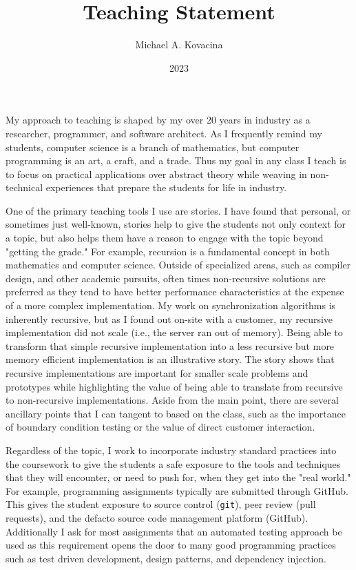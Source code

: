 \documentclass[12pt]{article}
\title{Teaching Statement}
\author{Michael A. Kovacina}
\date{2023}
\begin{document}
  \maketitle

My approach to teaching is shaped by my over 20 years in industry as a researcher, programmer, and software architect.  As I frequently remind my students, computer science is a branch of mathematics, but computer programming is an art, a craft, and a trade.  Thus my goal in any class I teach is to focus on practical applications over abstract theory while weaving in non-technical experiences that prepare the students for life in industry.

One of the primary teaching tools I use are stories.  I have found that personal, or sometimes just well-known, stories help to give the students not only context for a topic, but also helps them have a reason to engage with the topic beyond "getting the grade."  For example, recursion is a fundamental concept in both mathematics and computer science.  Outside of specialized areas, such as compiler design, and other academic pursuits, often times non-recursive solutions are preferred as they tend to have better performance characteristics at the expense of a more complex implementation.  My work on synchronization algorithms is inherently recursive, but as I found out on-site with a customer, my recursive implementation did not scale (i.e., the server ran out of memory).  Being able to transform that simple recursive implementation into a less recursive but more memory efficient implementation is an illustrative story.  The story shows that recursive implementations are important for smaller scale problems and prototypes while highlighting the value of being able to translate from recursive to non-recursive implementations.  Aside from the main point, there are several ancillary points that I can tangent to based on the class, such as the importance of boundary condition testing or the value of direct customer interaction.

Regardless of the topic, I work to incorporate industry standard practices into the coursework to give the students a safe exposure to the tools and techniques that they will encounter, or need to push for, when they get into the "real world."  For example, programming assignments typically are submitted through GitHub.  This gives the student exposure to source control (\texttt{git}), peer review (pull requests), and the defacto source code management platform (GitHub).  Additionally I ask for most assignments that an automated testing approach be used as this requirement opens the door to many good programming practices such as test driven development, design patterns, and dependency injection.
\end{document}
